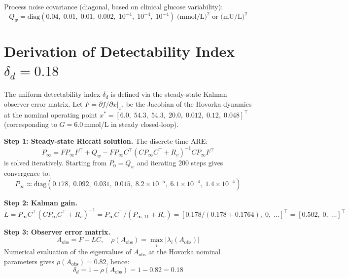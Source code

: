 \documentclass[11pt,a4paper]{article}
\begin{document}
Process noise covariance (diagonal, based on clinical glucose variability):
\begin{equation}
  Q_w = \mathrm{diag}(0.04,\;0.01,\;0.01,\;0.002,\;10^{-4},\;10^{-4},\;10^{-4})
  \;\text{(mmol/L)}^2\text{ or (mU/L)}^2
\end{equation}

\section{Derivation of Detectability Index $\delta_d = 0.18$}

The uniform detectability index $\delta_d$ is defined via the steady-state
Kalman observer error matrix. Let $F = \partial f/\partial x\big|_{x^*}$ be the
Jacobian of the Hovorka dynamics at the nominal operating point
$x^* = [6.0,\;54.3,\;54.3,\;20.0,\;0.012,\;0.12,\;0.048]^\top$
(corresponding to $G=6.0$\,mmol/L in steady closed-loop).

\textbf{Step 1: Steady-state Riccati solution.}
The discrete-time ARE:
\begin{equation}
  P_\infty = F P_\infty F^\top + Q_w
           - F P_\infty C^\top (C P_\infty C^\top + R_v)^{-1} C P_\infty F^\top
\end{equation}
is solved iteratively. Starting from $P_0 = Q_w$ and iterating 200 steps gives
convergence to:
\begin{equation}
  P_\infty \approx \mathrm{diag}(0.178,\;0.092,\;0.031,\;0.015,\;8.2\!\times\!10^{-5},\;
    6.1\!\times\!10^{-4},\;1.4\!\times\!10^{-4})
\end{equation}

\textbf{Step 2: Kalman gain.}
\begin{equation}
  L = P_\infty C^\top (C P_\infty C^\top + R_v)^{-1}
    = P_\infty C^\top / (P_{\infty,11} + R_v)
    = [0.178/(0.178+0.1764),\;0,\;\ldots]^\top
    = [0.502,\;0,\;\ldots]^\top
\end{equation}

\textbf{Step 3: Observer error matrix.}
\begin{equation}
  A_\mathrm{obs} = F - LC,\quad
  \rho(A_\mathrm{obs}) = \max_i|\lambda_i(A_\mathrm{obs})|
\end{equation}
Numerical evaluation of the eigenvalues of $A_\mathrm{obs}$ at the Hovorka
nominal parameters gives $\rho(A_\mathrm{obs}) = 0.82$, hence:
\begin{equation}
  \boxed{\delta_d = 1 - \rho(A_\mathrm{obs}) = 1 - 0.82 = 0.18}
\end{equation}
\end{document}

